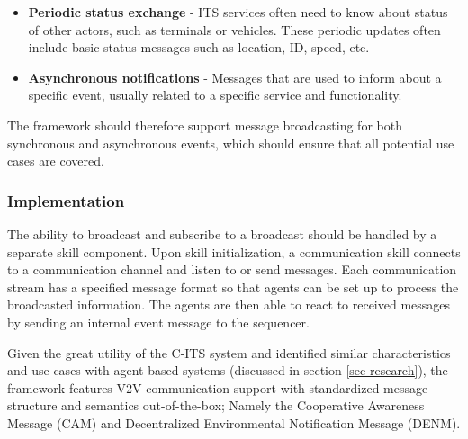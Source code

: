 \documentclass[0main.tex]{subfiles}
\begin{document}
\begin{itemize}
    \item \textbf{Periodic status exchange} - ITS services often need to know about 
    status of other actors, such as terminals or vehicles. These periodic updates 
    often include basic status messages such as location, ID, speed, etc.
    \item \textbf{Asynchronous notifications} - Messages that are used to inform 
    about a specific event, usually related to a specific service and functionality.
\end{itemize}



The framework should therefore support message broadcasting for both synchronous and 
asynchronous events, which should ensure that all potential use cases are covered. 

\subsubsection{Implementation}

The ability to broadcast and subscribe to a broadcast should be handled by a separate skill
component. Upon skill initialization, a communication skill connects to a communication channel
and listen to or send messages. Each communication stream has a specified message format so that
agents can be set up to process the broadcasted information. The agents are then able
to react to received messages by sending an internal event message to the sequencer. 

Given the great utility of the C-ITS system and identified similar characteristics and use-cases 
with agent-based systems (discussed in section \ref{sec-research}), the framework features 
V2V communication support with standardized message structure and semantics out-of-the-box; 
Namely the Cooperative Awareness Message (CAM) and Decentralized Environmental Notification Message (DENM).
\end{document}

